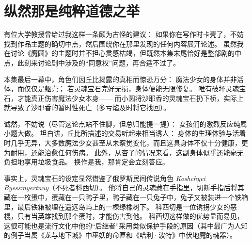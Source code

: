 \chapter[纵然那是纯粹道德之举]{纵然那是纯粹道德之举}



有位大学教授曾给过我这样一条颇为古怪的建议：
如果你在写作时卡壳了，不妨找到作品主题的确切中点，然后围绕你在那里发现的任何内容展开论述。
虽然我在讨论《魔圆》的主题时并不担心灵感枯竭，但既然本集末尾恰好是整部剧的中点，此刻来讨论剧中涉及的“同意权”问题，再合适不过了。

本集最后一幕中，角色们因丘比揭露的真相而惊恐万分：
魔法少女的身体并非活体，而仅仅是躯壳；
若灵魂宝石完好无损，身体便能无限修复。
唯有破坏灵魂宝石，才能真正伤害魔法少女本身——
而小圆将沙耶香的灵魂宝石扔下桥，实际上就导致了沙耶香的暂时性死亡（多亏焰及时将它找回）。

诚然，不妨说（尽管这论点站不住脚，但总归能提一提）：
女孩们的激烈反应纯属小题大做。
坦白讲，丘比所描述的交易听起来相当诱人：
身体的生理体验与活着时几乎无异，大多数魔法少女甚至从未察觉变化，而且这具身体不仅十分健康，更为耐用，还能治愈任何伤病。
此外，从杏子的情况来看，这副身体似乎还能毫无负担地享用垃圾食品。
换作是我，那肯定会立刻答应。

事实上，灵魂宝石的设定显然借鉴了俄罗斯民间传说角色 \emph{Koshchyei Byessmyertnuy}（不死者科西切）。
他将自己的灵魂藏在手指里，切断手指后将其藏在一枚蛋中，蛋藏在一只鸭子里，鸭子藏在一只兔子中，兔子又被装进一个铁箱里，最后铁箱被埋在遥远岛屿上的一棵绿橡树下。
科西切是一位诱拐少女的恶棍，只有当英雄找到那个蛋时，才能伤害到他\cite{ref34}。
科西切这样做的优势显而易见，这很可能也是流行文化中他的“后继者”采用类似保护手段的原因（其中最广为人知的例子当属《龙与地下城》\cite{ref35}中巫妖的命匣和《哈利·波特》\cite{ref36}中伏地魔的魂器）。

